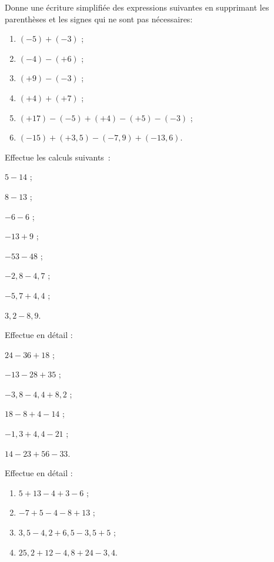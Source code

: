 \begin{exercice}
Donne une écriture simplifiée des expressions suivantes en supprimant les parenthèses et les signes qui ne sont pas nécessaires:
\begin{enumerate}
 \item $(-5) + (-3)$ ;
 \item $(-4) - (+6)$ ;
 \item $(+9) - (-3)$ ;
 \item $(+4) + (+7)$ ;
  \item $(+17) - (-5) + (+4) - (+5) - (-3)$ ;
  \item $(-15) + (+3,5) - (-7,9) + (-13,6)$.
  \end{enumerate}
\end{exercice}


\begin{exercice}
Effectue les calculs suivants :
\begin{colenumerate}{2}
 \item $5 - 14$ ;
 \item $8 - 13$ ;
 \item $-6 - 6$ ;
 \item $-13 + 9$ ;
 \item $-53 - 48$ ;
 \item $-2,8 - 4,7$ ;
 \item $-5,7 + 4,4$ ;
 \item $3,2 - 8,9$.
 \end{colenumerate}
\end{exercice}


\begin{exercice}
Effectue en détail :
\begin{colenumerate}{2}
 \item $24 - 36 + 18$ ;
 \item $-13 - 28 + 35$ ;
 \item $-3,8 - 4,4 + 8,2$ ;
 \item $18 - 8 + 4 - 14$ ;
 \item $-1,3 + 4,4 - 21$ ;
 \item $14 - 23 + 56 - 33$.
 \end{colenumerate}
\end{exercice}


\begin{exercice}
Effectue en détail :
\begin{enumerate}
 \item $5 + 13 - 4 + 3 - 6$ ;
 \item $-7 + 5 - 4 - 8 + 13$ ;
 \item $3,5 - 4,2 + 6,5 - 3,5 + 5$ ;
 \item $25,2 + 12 - 4,8 + 24 - 3,4$.
 \end{enumerate}
\end{exercice}


